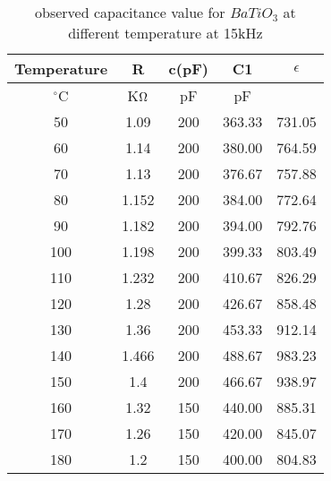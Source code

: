 \begin{table}[H]
    \centering
    \begin{tabular}{|c|c|c|c|c|}
        \hline
        Temperature & R       & c(pF) & C1     & $\epsilon$ \\ \hline
        $^{\circ}$C & K$\ohm$ & pF    & pF     & ~          \\ \hline
        50          & 1.09    & 200   & 363.33 & 731.05     \\ \hline
        60          & 1.14    & 200   & 380.00 & 764.59     \\ \hline
        70          & 1.13    & 200   & 376.67 & 757.88     \\ \hline
        80          & 1.152   & 200   & 384.00 & 772.64     \\ \hline
        90          & 1.182   & 200   & 394.00 & 792.76     \\ \hline
        100         & 1.198   & 200   & 399.33 & 803.49     \\ \hline
        110         & 1.232   & 200   & 410.67 & 826.29     \\ \hline
        120         & 1.28    & 200   & 426.67 & 858.48     \\ \hline
        130         & 1.36    & 200   & 453.33 & 912.14     \\ \hline
        140         & 1.466   & 200   & 488.67 & 983.23     \\ \hline
        150         & 1.4     & 200   & 466.67 & 938.97     \\ \hline
        160         & 1.32    & 150   & 440.00 & 885.31     \\ \hline
        170         & 1.26    & 150   & 420.00 & 845.07     \\ \hline
        180         & 1.2     & 150   & 400.00 & 804.83     \\ \hline
    \end{tabular}
    \caption{observed capacitance value for $BaTiO_3$ at different temperature at 15kHz}
    \label{tab:5}
\end{table}